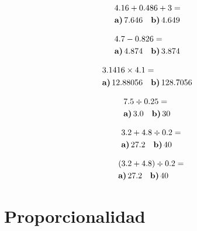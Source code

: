\documentclass[11pt]{article}
\begin{document}
\begin{multicols}{2}

\begin{align}
&4.16 + 0.486 + 3 = \\
&\textbf{a)}\, 7.646 \quad \textbf{b)}\, 4.649 \quad \nonumber
\end{align}

\vspace{2cm}

\begin{align}
&4.7 - 0.826 = \\
&\textbf{a)}\, 4.874 \quad \textbf{b)}\, 3.874 \quad \nonumber
\end{align}

\vspace{2cm}

\begin{align}
&3.1416 \times 4.1 = \\
&\textbf{a)}\, 12.88056 \quad \textbf{b)}\, 128.7056 \quad \nonumber 
\end{align}

\vspace{2cm}

\begin{align}
&7.5 \div 0.25 = \\
&\textbf{a)}\, 3.0 \quad \textbf{b)}\, 30 \quad \nonumber 
\end{align}

\vspace{2cm}

\begin{align}
&3.2 + 4.8 \div 0.2 = \\
&\textbf{a)}\, 27.2 \quad \textbf{b)}\, 40 \quad \nonumber 
\end{align}

\vspace{2cm}

\begin{align}
&(3.2 + 4.8) \div 0.2 = \\
&\textbf{a)}\, 27.2 \quad \textbf{b)}\, 40 \quad \nonumber 
\end{align}

\vspace{2cm}

\end{multicols}

\vspace{2cm}

\section{Proporcionalidad}
\end{document}
